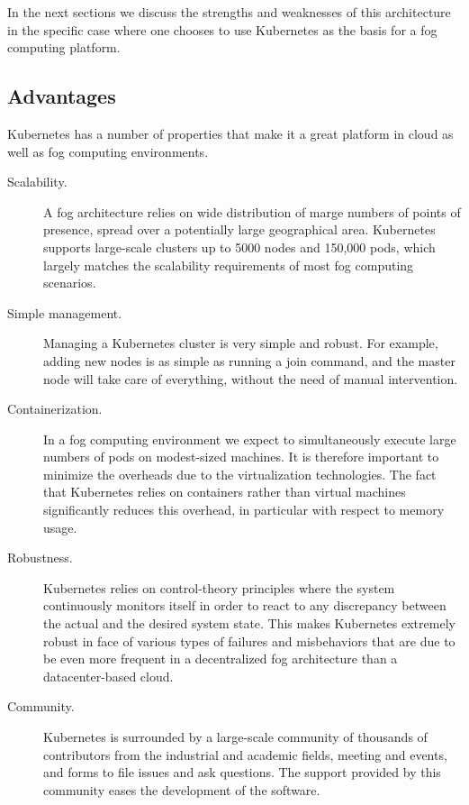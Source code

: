 \documentclass[letterpaper,twocolumn,10pt]{article}
\begin{document}
\medskip In the next sections we discuss the strengths and weaknesses
of this architecture in the specific case where one chooses to use
Kubernetes as the basis for a fog computing platform.


\subsection{Advantages}

Kubernetes has a number of properties that make it a great platform in
cloud as well as fog computing environments.


\begin{description}
\item[Scalability.] A fog architecture relies on wide distribution of
  marge numbers of points of presence, spread over a potentially large
  geographical area. Kubernetes supports large-scale clusters up to
  5000 nodes and 150,000 pods, which largely matches the scalability
  requirements of most fog computing scenarios.

\item[Simple management.] Managing a Kubernetes cluster is very simple
  and robust. For example, adding new nodes is as simple as running a
  join command, and the master node will take care of everything,
  without the need of manual intervention.

\item[Containerization.] In a fog computing environment we expect to
  simultaneously execute large numbers of pods on modest-sized
  machines. It is therefore important to minimize the overheads due to
  the virtualization technologies. The fact that Kubernetes relies on
  containers rather than virtual machines significantly reduces this
  overhead, in particular with respect to memory usage.

\item[Robustness.] Kubernetes relies on control-theory principles
  where the system continuously monitors itself in order to react to
  any discrepancy between the actual and the desired system
  state. This makes Kubernetes extremely robust in face of various
  types of failures and misbehaviors that are due to be even more
  frequent in a decentralized fog architecture than a datacenter-based
  cloud.

\item[Community.] Kubernetes is surrounded by a large-scale community
  of thousands of contributors from the industrial and academic
  fields, meeting and events, and forms to file issues and ask
  questions. The support provided by this community eases the
  development of the software.
\end{description}
\end{document}
